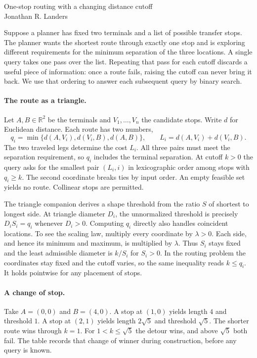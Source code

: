 \documentclass[11pt]{article}
\begin{document}
\begin{center}
{\LARGE One-stop routing with a changing distance cutoff}\\[6pt]
Jonathan R. Landers
\end{center}

Suppose a planner has fixed two terminals and a list of possible transfer
stops. The planner wants the shortest route through exactly one stop and is
exploring different requirements for the minimum separation of the three
locations. A single query takes one pass over the list. Repeating that pass
for each cutoff discards a useful piece of information: once a route fails,
raising the cutoff can never bring it back. We use that ordering to answer
each subsequent query by binary search.

\paragraph{The route as a triangle.}
Let $A,B\in\mathbb R^2$ be the terminals and $V_1,\ldots,V_n$ the candidate
stops. Write $d$ for Euclidean distance. Each route has two numbers,
\[
 q_i=\min\{d(A,V_i),d(V_i,B),d(A,B)\},\qquad
 L_i=d(A,V_i)+d(V_i,B).
\]
The two traveled legs determine the cost $L_i$. All three pairs must meet the
separation requirement, so $q_i$ includes the terminal separation. At cutoff
$k>0$ the query asks for the smallest pair $(L_i,i)$ in lexicographic order
among stops with $q_i\ge k$. The second coordinate breaks ties by input order.
An empty feasible set yields no route. Collinear stops are permitted.

The triangle companion derives a shape threshold from the ratio $S$ of shortest
to longest side. At triangle diameter $D_i$, the unnormalized threshold is
precisely $D_i S_i=q_i$ whenever $D_i>0$. Computing $q_i$ directly also
handles coincident locations. To see the scaling law, multiply every coordinate
by $\lambda>0$. Each side, and hence its minimum and maximum, is multiplied by
$\lambda$. Thus $S_i$ stays fixed and the least admissible diameter is
$k/S_i$ for $S_i>0$. In the routing problem the coordinates stay fixed and the
cutoff varies, so the same inequality reads $k\le q_i$. It holds pointwise
for any placement of stops.


\paragraph{A change of stop.}
Take $A=(0,0)$ and $B=(4,0)$. A stop at $(1,0)$ yields length $4$ and
threshold $1$. A stop at $(2,1)$ yields length $2\sqrt5$ and threshold
$\sqrt5$. The shorter route wins through $k=1$. For $1<k\le\sqrt5$ the
detour wins, and above $\sqrt5$ both fail. The table records that change of
winner during construction, before any query is known.
\end{document}
